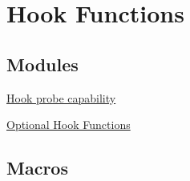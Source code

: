 \hypertarget{group___a_p_r___util___hook}{\section{Hook Functions}
\label{group___a_p_r___util___hook}
}
\subsection*{Modules}
\begin{DoxyCompactItemize}
\item 
\hyperlink{group__apr__hook__probes}{Hook probe capability}
\item 
\hyperlink{group___a_p_r___util___o_p_t___h_o_o_k}{Optional Hook Functions}
\end{DoxyCompactItemize}
\subsection*{Macros}
